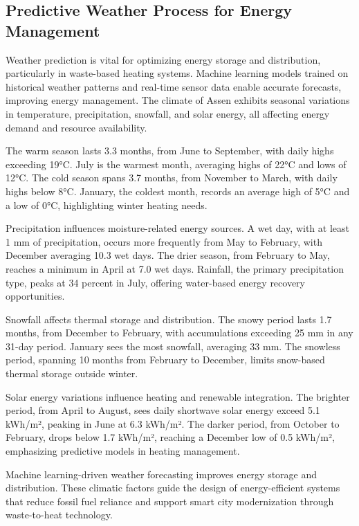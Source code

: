 \documentclass{article}
\begin{document}
\subsection{Predictive Weather Process for Energy Management}

Weather prediction is vital for optimizing energy storage and distribution, particularly in waste-based heating systems. Machine learning models trained on historical weather patterns and real-time sensor data enable accurate forecasts, improving energy management. The climate of Assen exhibits seasonal variations in temperature, precipitation, snowfall, and solar energy, all affecting energy demand and resource availability.

The warm season lasts 3.3 months, from June to September, with daily highs exceeding 19°C. July is the warmest month, averaging highs of 22°C and lows of 12°C. The cold season spans 3.7 months, from November to March, with daily highs below 8°C. January, the coldest month, records an average high of 5°C and a low of 0°C, highlighting winter heating needs. \cite{weatherspark_assen}

Precipitation influences moisture-related energy sources. A wet day, with at least 1 mm of precipitation, occurs more frequently from May to February, with December averaging 10.3 wet days. The drier season, from February to May, reaches a minimum in April at 7.0 wet days. Rainfall, the primary precipitation type, peaks at 34 percent in July, offering water-based energy recovery opportunities. \cite{weatherspark_assen}

Snowfall affects thermal storage and distribution. The snowy period lasts 1.7 months, from December to February, with accumulations exceeding 25 mm in any 31-day period. January sees the most snowfall, averaging 33 mm. The snowless period, spanning 10 months from February to December, limits snow-based thermal storage outside winter. \cite{weatherspark_assen}

Solar energy variations influence heating and renewable integration. The brighter period, from April to August, sees daily shortwave solar energy exceed 5.1 kWh/m², peaking in June at 6.3 kWh/m². The darker period, from October to February, drops below 1.7 kWh/m², reaching a December low of 0.5 kWh/m², emphasizing predictive models in heating management. \cite{weatherspark_assen}

Machine learning-driven weather forecasting improves energy storage and distribution. These climatic factors guide the design of energy-efficient systems that reduce fossil fuel reliance and support smart city modernization through waste-to-heat technology.
\end{document}
